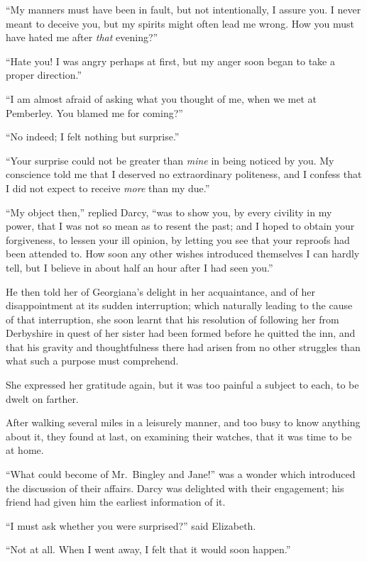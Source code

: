 ``My manners must have been in fault, but not intentionally,
I assure you.  I never meant to deceive you, but my spirits
might often lead me wrong.  How you must have hated me after
\emph{that} evening?''

``Hate you!  I was angry perhaps at first, but my anger soon
began to take a proper direction.''

``I am almost afraid of asking what you thought of me, when we
met at Pemberley.  You blamed me for coming?''

``No indeed; I felt nothing but surprise.''

``Your surprise could not be greater than \emph{mine} in being
noticed by you.  My conscience told me that I deserved no
extraordinary politeness, and I confess that I did not expect
to receive \emph{more} than my due.''

``My object then,'' replied Darcy, ``was to show you, by every
civility in my power, that I was not so mean as to resent the
past; and I hoped to obtain your forgiveness, to lessen your
ill opinion, by letting you see that your reproofs had been
attended to.  How soon any other wishes introduced themselves
I can hardly tell, but I believe in about half an hour after
I had seen you.''

He then told her of Georgiana's delight in her acquaintance,
and of her disappointment at its sudden interruption; which
naturally leading to the cause of that interruption, she soon
learnt that his resolution of following her from Derbyshire in
quest of her sister had been formed before he quitted the inn,
and that his gravity and thoughtfulness there had arisen from
no other struggles than what such a purpose must comprehend.

She expressed her gratitude again, but it was too painful a
subject to each, to be dwelt on farther.

After walking several miles in a leisurely manner, and too busy
to know anything about it, they found at last, on examining
their watches, that it was time to be at home.

``What could become of Mr.\ Bingley and Jane!'' was a wonder
which introduced the discussion of their affairs.  Darcy
was delighted with their engagement; his friend had given
him the earliest information of it.

``I must ask whether you were surprised?'' said Elizabeth.

``Not at all.  When I went away, I felt that it would soon
happen.''

